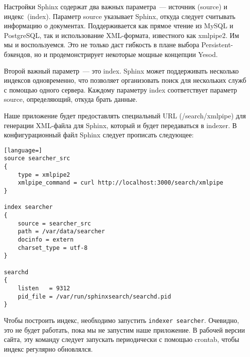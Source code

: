 Настройки Sphinx содержат два важных параметра~--- источник (source) и индекс~(index). Параметр source указывает Sphinx, откуда следует считывать информацию о документах. Поддерживается как прямое чтение из MySQL и PostgreSQL, так и использование XML-формата, известного как xmlpipe2. Им мы и воспользуемся. Это не только даст гибкость в плане выбора Persistent-бэкендов, но и продемонстрирует некоторые мощные концепции Yesod.

Второй важный параметр~--- это index. Sphinx может поддерживать несколько индексов одновременно, что позволяет организовать поиск для нескольких служб с помощью одного сервера. Каждому параметру index соответствует параметр source, определяющий, откуда брать данные.

Наше приложение будет предоставлять специальный URL (/search/xmlpipe) для генерации XML-файла для Sphinx, который и будет передаваться в indexer. В конфигурационный файл Sphinx следует прописать следующее:
\begin{lstlisting}[language=]
source searcher_src
{
    type = xmlpipe2
    xmlpipe_command = curl http://localhost:3000/search/xmlpipe
}

index searcher
{
    source = searcher_src
    path = /var/data/searcher
    docinfo = extern
    charset_type = utf-8
}

searchd
{
    listen   = 9312
    pid_file = /var/run/sphinxsearch/searchd.pid
}
\end{lstlisting}

Чтобы построить индекс, необходимо запустить \lstinline!indexer searcher!. Очевидно, это не будет работать, пока мы не запустим наше приложение. В рабочей версии сайта, эту команду следует запускать периодически с помощью crontab, чтобы индекс регулярно обновлялся.

